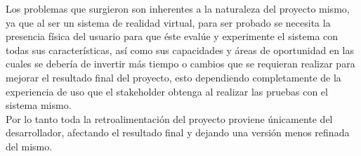 Los problemas que surgieron son inherentes a la naturaleza del proyecto mismo, ya que al ser un sistema de realidad virtual, para ser probado se necesita la presencia física del usuario para que éste evalúe y experimente el sistema con todas sus características, así como sus capacidades y áreas de oportunidad en las cuales se debería de invertir más tiempo o cambios que se requieran realizar para mejorar el resultado final del proyecto, esto dependiendo completamente de la experiencia  de uso que el stakeholder obtenga al realizar las pruebas con el sistema mismo.\\

Por lo tanto toda la retroalimentación del proyecto proviene únicamente del desarrollador, afectando el resultado final y dejando una versión menos refinada del mismo.\\
